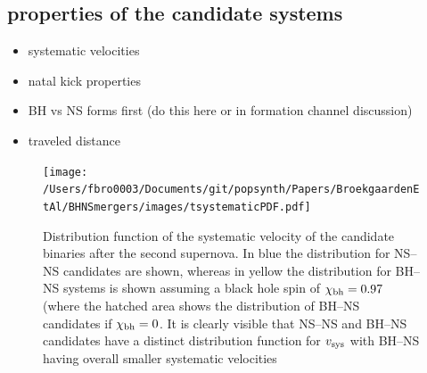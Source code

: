 \documentclass[a4paper,fleqn,usenatbib,useAMS,usedcolumn]{mnras}
\begin{document}
\subsection{properties of the candidate systems}
\begin{itemize}
	\item systematic velocities
	\item natal kick properties
	\item BH vs NS forms first  (do this here or in formation channel discussion) 
	\item traveled distance
\end{itemize}
%
\begin{figure}
	\texttt{[image: /Users/fbro0003/Documents/git/popsynth/Papers/BroekgaardenEtAl/BHNSmergers/images/tsystematicPDF.pdf]} %
    \caption{Distribution function of the systematic velocity of the candidate binaries after the second supernova. In blue the distribution for NS--NS candidates are shown, whereas in yellow the distribution for BH--NS systems is shown assuming a black hole spin of  $\chi_{\rm{bh}} = 0.97$ (where the hatched  area shows the distribution of BH--NS candidates if $\chi_{\rm{bh}} = 0$. It is clearly visible that NS--NS and BH--NS candidates have a distinct distribution function for $v_{\rm{sys }}$ with BH--NS having overall smaller systematic velocities}
    \label{fig:NbinariesVsNHits}
\end{figure}
%
\end{document}
